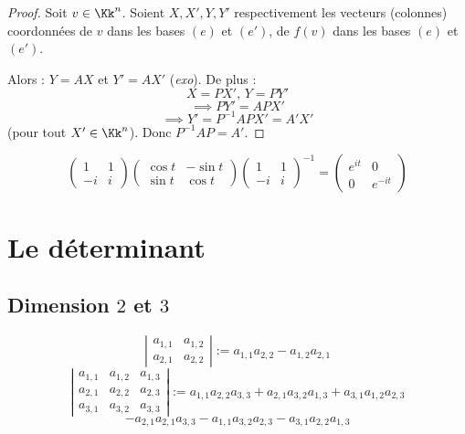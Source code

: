 \documentclass[class=report,crop=false]{standalone}
\begin{document}
\begin{proof}
Soit $v \in \Kk^n$. Soient $X,X',Y,Y'$ respectivement les vecteurs (colonnes) coordonnées de $v$ dans les bases $(e)$ et $(e')$, de $f(v)$ dans les bases $(e)$ et $(e')$. 

Alors : $Y = AX$ et $Y'= AX'$ ({\it exo}). De plus :
\[X = PX',\, Y = PY' \]
\[\implies PY' = APX'\]
\[\implies Y' = P^{-1} AP X' = A'X'\]
(pour tout $X' \in \Kk^n$). Donc $P^{-1} AP = A'$.

\end{proof}

\begin{exercicecours}
\[\left(\begin{array}{cc}
1&1\\
-i&i
\end{array}\right)  \left(\begin{array}{cc}
\cos t& -\sin t\\
\sin t& \cos t
\end{array}\right)  \left(\begin{array}{cc}
1&1\\
-i &i
\end{array}\right)^{-1} = \left(\begin{array}{cc}
e^{it}&0\\
0&e^{-it}

\end{array}\right)\]
\end{exercicecours}



\chapter{Le déterminant}

\section{Dimension $2$ et $3$}

\begin{definition}
\[\left|\begin{array}{cc}
a_{1,1}& a_{1,2}\\
a_{2,1}& a_{2,2}
\end{array}\right| := a_{1,1}a_{2,2}- a_{1,2}a_{2,1}\]
\[\left|\begin{array}{ccc}
a_{1,1}& a_{1,2} & a_{1,3}\\
a_{2,1}& a_{2,2}& a_{2,3}\\
a_{3,1}& a_{3,2} & a_{3,3}
\end{array}\right| := a_{1,1}a_{2,2}a_{3,3} + a_{2,1}a_{3,2}a_{1,3} + a_{3,1}a_{1,2}a_{2,3} \]\[ - a_{2,1}a_{2,1}a_{3,3} - a_{1,1}a_{3,2}a_{2,3} - a_{3,1}a_{2,2}a_{1,3} \]


\end{definition}
\end{document}

